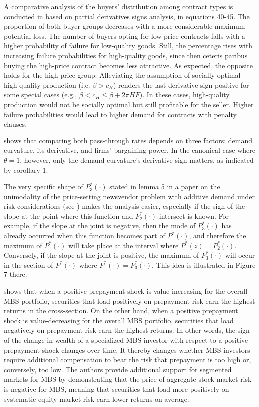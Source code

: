 \documentclass[11pt]{book}
\begin{document}
A comparative analysis of the buyers' distribution among contract
types is conducted in \cite{noll2004optimal} based on partial derivatives
signs analysis, in equations 40-45. The proportion of both buyer groups
decreases with a more considerable maximum potential loss. The number
of buyers opting for low-price contracts falls with a higher probability
of failure for low-quality goods. Still, the percentage rises with
increasing failure probabilities for high-quality goods, since then
ceteris paribus buying the high-price contract becomes less attractive.
As expected, the opposite holds for the high-price group. Alleviating
the assumption of socially optimal high-quality production (i.e. $\beta>c_{H}$)
renders the last derivative sign positive for some special cases (e.g.,
$\beta<c_{H}\leq\beta+2\pi HF$). In these cases, high-quality production
would not be socially optimal but still profitable for the seller.
Higher failure probabilities would lead to higher demand for contracts
with penalty clauses.

\cite{gaudin2016pass} shows that comparing both pass-through rates depends on three factors: demand
curvature, its derivative, and firms' bargaining power. In the canonical
case where $\theta=1$, however, only the demand curvature's derivative
sign matters, as indicated by corollary 1.

The very specific shape of $P_{3}^{*}\left(\cdot\right)$ stated in
lemma 5 in a paper on the unimodality of the price-setting
newsvendor problem with additive demand under risk considerations (see \cite{rubio2018unimodality}) makes the analysis easier,
especially if the sign of the slope at the point where this function
and $P_{2}^{*}\left(\cdot\right)$ intersect is known. For example,
if the slope at the joint is negative, then the mode of $P_{3}^{*}\left(\cdot\right)$
has already occurred when this function becomes part of $P^{*}\left(\cdot\right)$,
and therefore the maximum of $P^{*}\left(\cdot\right)$ will take
place at the interval where $P^{*}\left(z\right)=P_{2}^{*}\left(\cdot\right)$.
Conversely, if the slope at the joint is positive, the maximum of $P_{3}^{*}\left(\cdot\right)$
will occur in the section of $P^{*}\left(\cdot\right)$ where $P^{*}\left(\cdot\right)=P_{3}^{*}\left(\cdot\right)$.
This idea is illustrated in Figure 7 there.

\cite{diep2021cross} shows that when a positive prepayment shock
is value-increasing for the overall MBS portfolio, securities that
load positively on prepayment risk earn the highest returns in the
cross-section. On the other hand, when a positive prepayment shock
is value-decreasing for the overall MBS portfolio, securities that
load negatively on prepayment risk earn the highest returns. In other
words, the sign of the change in wealth of a specialized MBS investor
with respect to a positive prepayment shock changes over time. It
thereby changes whether MBS investors require additional compensation
to bear the risk that prepayment is too high or, conversely, too low.
The authors provide additional support for segmented markets for MBS
by demonstrating that the price of aggregate stock market risk is
negative for MBS, meaning that securities that load more positively
on systematic equity market risk earn lower returns on average.
\end{document}
